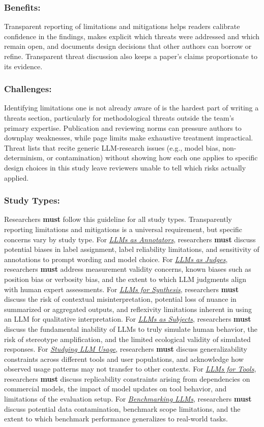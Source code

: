 \documentclass[smallextended]{svjour3}
\newcommand{\must}{\textbf{must}\xspace}
\newcommand{\annotators}{\hyperref[sec:llms-as-annotators]{\emph{LLMs as Annotators}}\xspace}
\newcommand{\judges}{\hyperref[sec:llms-as-judges]{\emph{LLMs as Judges}}\xspace}
\newcommand{\synthesis}{\hyperref[sec:llms-for-synthesis]{\emph{LLMs for Synthesis}}\xspace}
\newcommand{\subjects}{\hyperref[sec:llms-as-subjects]{\emph{LLMs as Subjects}}\xspace}
\newcommand{\llmusage}{\hyperref[sec:studying-llm-usage-in-software-engineering]{\emph{Studying LLM Usage}}\xspace}
\newcommand{\newtools}{\hyperref[sec:llms-for-new-software-engineering-tools]{\emph{LLMs for Tools}}\xspace}
\newcommand{\benchmarkingtasks}{\hyperref[sec:benchmarking-llms-for-software-engineering-tasks]{\emph{Benchmarking LLMs}}\xspace}
\newcommand{\annotators}{\href{/study-types\#llms-as-annotators}{\emph{LLMs as Annotators}}\xspace}
\newcommand{\judges}{\href{/study-types\#llms-as-judges}{\emph{LLMs as Judges}}\xspace}
\newcommand{\synthesis}{\href{/study-types\#llms-for-synthesis}{\emph{LLMs for Synthesis}}\xspace}
\newcommand{\subjects}{\href{/study-types\#llms-as-subjects}{\emph{LLMs as Subjects}}\xspace}
\newcommand{\llmusage}{\href{/study-types\#studying-llm-usage-in-software-engineering}{\emph{Studying LLM Usage}}\xspace}
\newcommand{\newtools}{\href{/study-types\#llms-for-new-software-engineering-tools}{\emph{LLMs for Tools}}\xspace}
\newcommand{\benchmarkingtasks}{\href{/study-types\#benchmarking-llms-for-software-engineering-tasks}{\emph{Benchmarking LLMs}}\xspace}
\newcommand{\guidelinesubsubsection}[1]{\subsubsection{\bfseries #1:}}
\newcommand{\guidelinesubsubsection}[1]{\subsubsection{#1}}
\begin{document}
\guidelinesubsubsection{Benefits}

Transparent reporting of limitations and mitigations helps readers calibrate confidence in the findings, makes explicit which threats were addressed and which remain open, and documents design decisions that other authors can borrow or refine. Transparent threat discussion also keeps a paper's claims proportionate to its evidence.

\guidelinesubsubsection{Challenges}

Identifying limitations one is not already aware of is the hardest part of writing a threats section, particularly for methodological threats outside the team's primary expertise. Publication and reviewing norms can pressure authors to downplay weaknesses, while page limits make exhaustive treatment impractical. Threat lists that recite generic LLM-research issues (e.g., model bias, non-determinism, or contamination) without showing how each one applies to specific design choices in this study leave reviewers unable to tell which risks actually applied.

\guidelinesubsubsection{Study Types}

Researchers \must follow this guideline for all study types. Transparently reporting limitations and mitigations is a universal requirement, but specific concerns vary by study type.
For \annotators, researchers \must discuss potential biases in label assignment, label reliability limitations, and sensitivity of annotations to prompt wording and model choice.
For \judges, researchers \must address measurement validity concerns, known biases such as position bias or verbosity bias, and the extent to which LLM judgments align with human expert assessments.
For \synthesis, researchers \must discuss the risk of contextual misinterpretation, potential loss of nuance in summarized or aggregated outputs, and reflexivity limitations inherent in using an LLM for qualitative interpretation.
For \subjects, researchers \must discuss the fundamental inability of LLMs to truly simulate human behavior, the risk of stereotype amplification, and the limited ecological validity of simulated responses.
For \llmusage, researchers \must discuss generalizability constraints across different tools and user populations, and acknowledge how observed usage patterns may not transfer to other contexts.
For \newtools, researchers \must discuss replicability constraints arising from dependencies on commercial models, the impact of model updates on tool behavior, and limitations of the evaluation setup.
For \benchmarkingtasks, researchers \must discuss potential data contamination, benchmark scope limitations, and the extent to which benchmark performance generalizes to real-world tasks.
\end{document}
